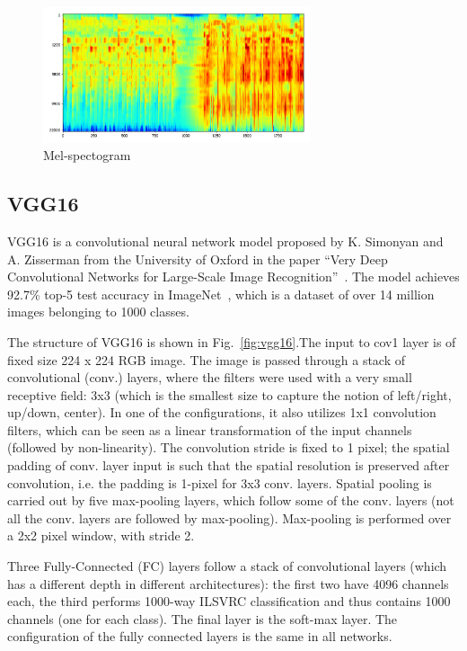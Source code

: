 \begin{figure}[!htbp]
	\centering
	\includegraphics[width = 0.7\textwidth]{figures_ning/audio_6.png}
	\caption[Mel-spectogram]
	{ Mel-spectogram}
	\label{fig:audio_6}
\end{figure}

\subsection{VGG16}

VGG16 is a convolutional neural network model proposed by K. Simonyan and A. Zisserman from the University of Oxford in the paper ``Very Deep Convolutional Networks for Large-Scale Image Recognition''~\cite{simonyan2015deep}. The model achieves 92.7\% top-5 test accuracy in ImageNet~\cite{ILSVRC15}, which is a dataset of over 14 million images belonging to 1000 classes.

The structure of VGG16 is shown in Fig.~\ref{fig:vgg16}.The input to cov1 layer is of fixed size 224 x 224 RGB image. The image is passed through a stack of convolutional (conv.) layers, where the filters were used with a very small receptive field: 3x3 (which is the smallest size to capture the notion of left/right, up/down, center). In one of the configurations, it also utilizes 1x1 convolution filters, which can be seen as a linear transformation of the input channels (followed by non-linearity). The convolution stride is fixed to 1 pixel; the spatial padding of conv. layer input is such that the spatial resolution is preserved after convolution, i.e. the padding is 1-pixel for 3x3 conv. layers. Spatial pooling is carried out by five max-pooling layers, which follow some of the conv.  layers (not all the conv. layers are followed by max-pooling). Max-pooling is performed over a 2x2 pixel window, with stride 2.

Three Fully-Connected (FC) layers follow a stack of convolutional layers (which has a different depth in different architectures): the first two have 4096 channels each, the third performs 1000-way ILSVRC classification and thus contains 1000 channels (one for each class). The final layer is the soft-max layer. The configuration of the fully connected layers is the same in all networks.

